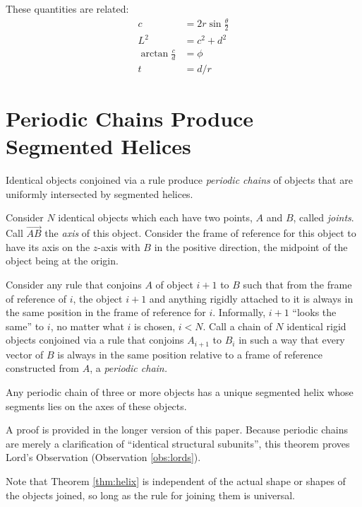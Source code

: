\documentclass{svproc}
\begin{document}
These quantities are related:
\begin{align}
    c &= 2r\sin{\frac{\theta}{2}} \\
    L^2 &= c^2+d^2  \\
    \arctan{\frac{c}{d}}  &= \phi \\
    t &= d / r
\end{align}

\label{sec:SegmentedHelix}

\section{Periodic Chains Produce Segmented Helices}

Identical objects conjoined via a rule
produce {\em periodic chains} of objects that are uniformly intersected
by segmented helices.

Consider $N$ identical objects which each have two points, $A$ and $B$, called {\em joints}. Call
$\overrightarrow{AB}$ the {\em axis} of this object.
Consider the frame of reference for this object to have
its axis on the $z$-axis with $B$ in the positive direction, the
midpoint of the object being at the origin.

Consider any rule that conjoins $A$ of object $i+1$ to $B$ such that
from the frame of reference of $i$, the object $i+1$ and anything rigidly
attached to it is always in the same position in the frame of reference for $i$.
Informally, $i+1$ ``looks the same'' to $i$, no matter what $i$ is chosen, $i < N$.
Call a chain of $N$ identical rigid objects conjoined via a rule that
conjoins $A_{i+1}$ to $B_i$ in such a way that every vector
of $B$ is always in the same position relative to a frame of reference
constructed from $A$, a {\em periodic chain.}

\begin{theorem}
  \label{thm:helix}
  Any periodic chain of three or more objects has a unique segmented helix
  whose segments
  lies on the axes of these objects.
\end{theorem}

A proof is provided in the longer version of this paper\cite{readfullsegmentedhelix}.
Because periodic chains are merely a clarification of ``identical structural subunits'',
this theorem proves Lord's Observation (Observation \ref{obs:lords}).

Note that Theorem \ref{thm:helix} is independent of the actual
shape or shapes of the objects joined, so long as the rule for joining them
is universal.
\end{document}
